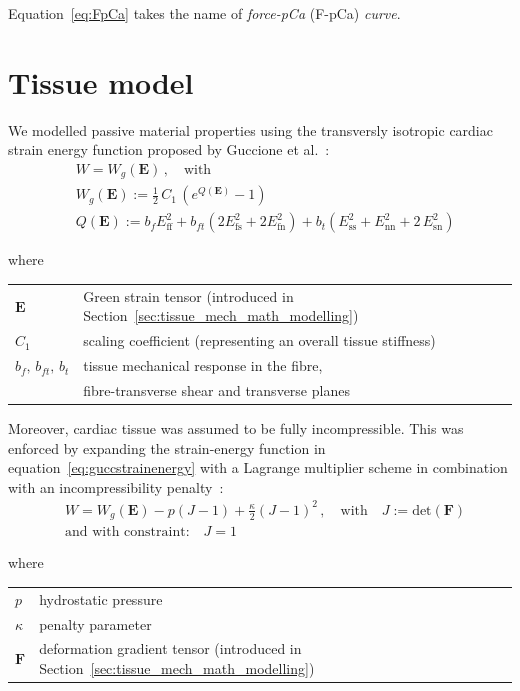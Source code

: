 \noindent
Equation~\eqref{eq:FpCa} takes the name of \textit{force-pCa} (\acs{F-pCa}) \textit{curve}.


%
%
%
\section{Tissue model}
We modelled passive material properties using the transversly isotropic cardiac strain energy function proposed by Guccione et al.~\cite{Guccione:1991}:
%
\begin{align}\label{eq:guccstrainenergy}
    &W = W_g(\mathbf{E})\,,\quad\text{with} \\
    &W_g(\mathbf{E}) := \frac{1}{2}\,C_1\,(e^{Q(\mathbf{E})}-1) \\
    &Q(\mathbf{E}) := b_f E_{\text{ff}}^2 + b_{ft}(2E_{\text{fs}}^2+2E_{\text{fn}}^2) + b_t(E_{\text{ss}}^2+E_{\text{nn}}^2+2\,E_{\text{sn}}^2)
\end{align}

\noindent
where

\vspace{0.2cm}
\begin{tabular}{ll}
    $\mathbf{E}$ & Green strain tensor (introduced in Section~\ref{sec:tissue_mech_math_modelling}) \\
    $C_1$ & scaling coefficient (representing an overall tissue stiffness) \\
    $b_f,\,b_{ft},\,b_t$ & tissue mechanical response in the fibre, \\ & fibre-transverse shear and transverse planes \\
\end{tabular}

\vspace{0.3cm}\noindent
Moreover, cardiac tissue was assumed to be fully incompressible. This was enforced by expanding the strain-energy function in equation~\eqref{eq:guccstrainenergy} with a Lagrange multiplier scheme in combination with an incompressibility penalty~\cite{Land:2015*b}:
%
\begin{align}\label{eq:landstrainenergy}
    &W = W_g(\mathbf{E}) - p(J - 1) + \frac{\kappa}{2}(J - 1)^2\,,\quad\text{with}\quad J:=\text{det}(\mathbf{F}) \\
    &\text{and with constraint:}\quad J=1
\end{align}

\noindent
where

\vspace{0.2cm}
\begin{tabular}{ll}
    $p$ & hydrostatic pressure \\
    $\kappa$ & penalty parameter \\
    $\mathbf{F}$ & deformation gradient tensor (introduced in Section~\ref{sec:tissue_mech_math_modelling})
\end{tabular}


